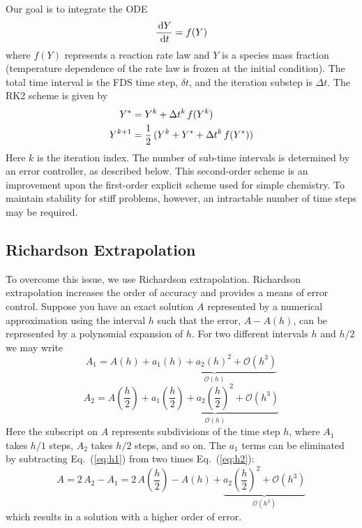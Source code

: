 Our goal is to integrate the ODE
\begin{equation}
\frac{\,\mathrm{d} Y}{\,\mathrm{d} t} = f(Y)
\end{equation}
where $f(Y)$ represents a reaction rate law and $Y$ is a species mass fraction (temperature dependence of the rate law is frozen
at the initial condition).  The total time interval is the FDS time step, $\delta t$, and the iteration substep is $\Delta t$. The
RK2 scheme is given by
\begin{align}
\label{RK2}
Y^* &= Y^k + \Delta t^k \, f(Y^k) \notag\\
Y^{k+1}   &= \frac{1}{2}\,(Y^k + Y^* + \Delta t^k \, f(Y^*))
\end{align}
Here $k$ is the iteration index.  The number of sub-time intervals is determined by an error controller, as described below. This
second-order scheme is an improvement upon the first-order explicit scheme used for simple chemistry. To maintain stability for
stiff problems, however, an intractable number of time steps may be required.

\subsection*{Richardson Extrapolation}

To overcome this issue, we use Richardson extrapolation. Richardson extrapolation increases the order of accuracy and provides a
means of error control. Suppose you have an exact solution $A$ represented by a numerical approximation using the interval $h$
such that the error, $A-A(h)$, can be represented by a polynomial expansion of $h$. For
two different intervals $h$ and $h/2$ we may write
\begin{equation}\label{eq:h1}
A_1={A(h)} + \underbrace{a_{1}(h) + a_{2}(h)^2 + \mathcal{O}(h^3)}_{\mathcal{O}(h)}
\end{equation}
\begin{equation}\label{eq:h2}
A_2=A\left(\frac{h}{2}\right) + \underbrace{a_{1}\left(\frac{h}{2}\right) + a_{2}\left(\frac{h}{2}\right)^2 +
\mathcal{O}(h^3)}_{\mathcal{O}(h)}
\end{equation}
Here the subscript on $A$ represents subdivisions of the time step $h$, where $A_1$ takes $h/1$ steps, $A_2$ takes $h/2$ steps,
and so on. The $a_{1}$ terms can be eliminated by subtracting Eq.~(\ref{eq:h1}) from two times Eq.~(\ref{eq:h2}):
\begin{equation}\label{eq:A2}
A=2\,A_2-A_1 = 2\,A\left(\frac{h}{2}\right) - A(h) + \underbrace{a_{2}\left(\frac{h}{2}\right)^2 +
\mathcal{O}(h^3)}_{\mathcal{O}(h^2)}
\end{equation}
which results in a solution with a higher order of error.

